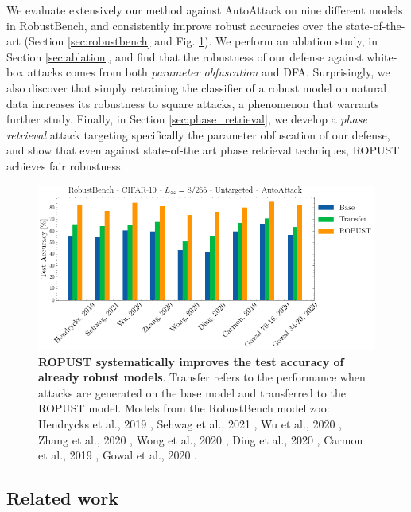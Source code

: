 We evaluate extensively our method against AutoAttack on nine different models in RobustBench, and consistently improve robust accuracies over the state-of-the-art (Section \ref{sec:robustbench} and Fig. \ref{fig:robustbench}). We perform an ablation study, in Section \ref{sec:ablation}, and find that the robustness of our defense against white-box attacks comes from both \emph{parameter obfuscation} and DFA. Surprisingly, we also discover that simply retraining the classifier of a robust model on natural data increases its robustness to square attacks, a phenomenon that warrants further study. Finally, in Section \ref{sec:phase_retrieval}, we develop a \emph{phase retrieval} attack targeting specifically the parameter obfuscation of our defense, and show that even against state-of-the art phase retrieval techniques, ROPUST achieves fair robustness.

\begin{figure}
    \centering
    \includegraphics[width=\textwidth]{sections/appendix/ropust_icassp2022/robustbench_lead.png}
    \caption{\textbf{ROPUST systematically improves the test accuracy of already robust models}. Transfer refers to the performance when attacks are generated on the base model and transferred to the ROPUST model. Models from the RobustBench model zoo: Hendrycks et al., 2019 \cite{Hendrycks2019UsingPC}, Sehwag et al., 2021 \cite{Sehwag2021ImprovingAR}, Wu et al., 2020 \cite{Wu2020AdversarialWP}, Zhang et al., 2020 \cite{Zhang2020GeometryawareIA}, Wong et al., 2020 \cite{Wong2020FastIB}, Ding et al., 2020 \cite{Ding2020MaxMarginA}, Carmon et al., 2019 \cite{Carmon2019UnlabeledDI}, Gowal et al., 2020 \cite{Gowal2020UncoveringTL}.}
    \label{fig:robustbench}
\end{figure}

\subsection{Related work}

